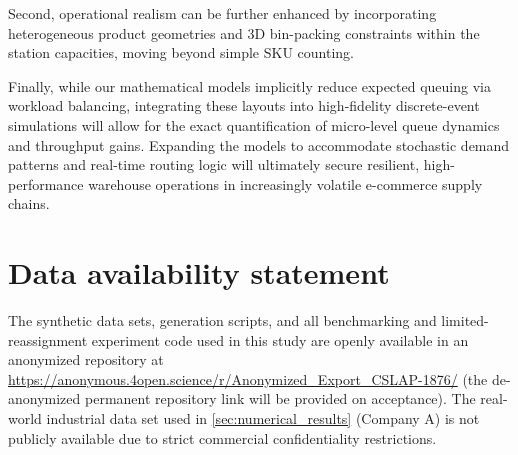 \documentclass[preprint,review,11pt,authoryear]{elsarticle}
\begin{document}
Second, operational realism can be further enhanced by incorporating heterogeneous product geometries and 3D bin-packing constraints within the station capacities, moving beyond simple SKU counting. 

Finally, while our mathematical models implicitly reduce expected queuing via workload balancing, integrating these layouts into high-fidelity discrete-event simulations will allow for the exact quantification of micro-level queue dynamics and throughput gains. Expanding the models to accommodate stochastic demand patterns and real-time routing logic will ultimately secure resilient, high-performance warehouse operations in increasingly volatile e-commerce supply chains.





\section*{Data availability statement}
The synthetic data sets, generation scripts, and all benchmarking and limited-reassignment experiment code used in this study are openly available in an anonymized repository at \url{https://anonymous.4open.science/r/Anonymized_Export_CSLAP-1876/} (the de-anonymized permanent repository link will be provided on acceptance). The real-world industrial data set used in \cref{sec:numerical_results} (Company A) is not publicly available due to strict commercial confidentiality restrictions.


\end{document}
